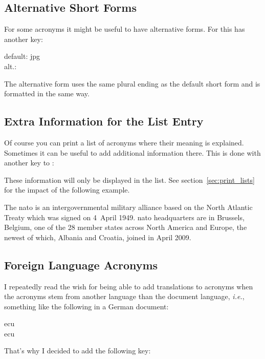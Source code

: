 \documentclass[DIV10,toc=index,toc=bib,hyperfootnotes=false]{cnpkgdoc}
\makeatletter
\providecommand*\sinceversion[1]{%
  \@bsphack
  \marginnote{%
    \footnotesize\sffamily\RaggedRight
    \textcolor{black!75}{Introduced in version~#1}}%
  \@esphack}
\makeatother
\begin{document}
\subsection{Alternative Short Forms}
For some acronyms it might be useful to have alternative forms. For this
 has another key:
\begin{beschreibung}
\end{beschreibung}
\begin{beispiel}
 default: \acs{jpg} \\
 alt.: 
\end{beispiel}
The alternative form uses the same plural ending as the default short form and
is formatted in the same way.

\subsection{Extra Information for the List Entry}
Of course you can print a list of acronyms where their meaning is explained.
Sometimes it can be useful to add additional information there. This is done with
another key to :
\begin{beschreibung}
\end{beschreibung}
These information will only be displayed in the list. See section~\ref{sec:print_lists}
for the impact of the following example.

\begin{beispiel}
 The \ac{nato} is an intergovernmental military alliance based on the
 North Atlantic Treaty which was signed on 4~April 1949. \ac{nato}
 headquarters are in Brussels, Belgium, one of the 28 member states
 across North America and Europe, the newest of which, Albania and
 Croatia, joined in April 2009.
\end{beispiel}

\subsection{Foreign Language Acronyms}\label{ssec:foreign}
\noindent\sinceversion{1.3}I repeatedly read the wish for being able to add
translations to acronyms when the acronyms stem from another language than
the document language, \textit{i.e.}, something like the following in a German
document:
\begin{beispiel}
 \ac{ecu}\\
 \ac{ecu}
\end{beispiel}
That's why I decided to add the following key:
\begin{beschreibung}
\end{beschreibung}
\end{document}
